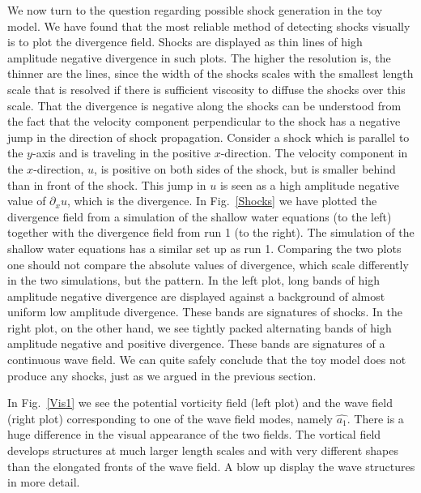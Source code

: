  
 We now turn to the question regarding possible shock generation in the toy model.  We have found that the most reliable method of detecting shocks visually is to plot the divergence field. Shocks are displayed as thin lines of high amplitude negative divergence in such plots. The higher the resolution is, the thinner are the lines, since the width of the shocks scales with the smallest length scale that is resolved if there is sufficient viscosity to diffuse the shocks over this scale.
That the divergence is negative along the shocks  can be understood from the fact that the velocity component perpendicular to the shock has a negative jump in the direction of shock propagation.  Consider a shock which is parallel to the $ y $-axis and is traveling in the positive $ x $-direction. The velocity component in the $ x $-direction, $ u $, is positive on both sides of the shock, but is  smaller behind than in front of the shock. This jump in $ u $ is seen as a high amplitude negative value of $ \partial_x u $, which is the divergence. In Fig.~\ref{Shocks} we have plotted the divergence field from a simulation of the shallow water equations (to the left) together with the divergence field from run 1 (to the right). 
The simulation of the shallow water equations has a similar set up as run 1. 
{ Comparing the two plots one should not compare the absolute values of divergence, which scale differently in the two simulations, but  the pattern. In the left plot, long bands of high amplitude negative divergence are displayed against a background of almost uniform low amplitude divergence. These bands are signatures of shocks. In the right plot, on the other hand, we see tightly packed alternating bands of high amplitude negative and positive divergence. These bands are signatures of a continuous wave field.}
We can quite safely conclude that the toy model does not produce any shocks, just as we argued in the previous section. 

In Fig.~\ref{Vis1} we see the potential vorticity field (left plot) and the wave field (right plot) corresponding to one of the wave field modes, namely $ \widehat{a_1} $. There is a huge difference in the visual appearance of the two fields. The vortical field develops structures at much larger length scales and with very different shapes than the elongated fronts of the wave field. A blow up display the wave structures in more detail. 




